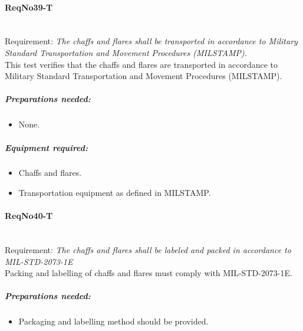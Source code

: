 \paragraph{ReqNo39-T}\mbox{}\\ %
Requirement: \textit{The chaffs and flares shall be transported in accordance to Military Standard Transportation and Movement Procedures (MILSTAMP).}\\

This test verifies that the chaffs and flares are transported in accordance to Military Standard Transportation and Movement Procedures (MILSTAMP).
	\subparagraph{Preparations needed:}
	\begin{itemize}
	\item None. 
	\end{itemize}
			
	\subparagraph{Equipment required:}
	\begin{itemize}
	\item Chaffs and flares.
	\item Transportation equipment as defined in MILSTAMP.
	\end{itemize}

\paragraph{ReqNo40-T}\mbox{}\\ %
Requirement: \textit{The chaffs and flares shall be labeled and packed in accordance to MIL-STD-2073-1E}\\
Packing and labelling of chaffs and flares must comply with MIL-STD-2073-1E.

	\subparagraph{Preparations needed:}
	\begin{itemize}
	\item Packaging and labelling method should be provided. 
	\end{itemize}
